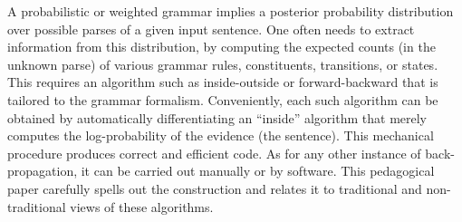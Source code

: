 A probabilistic or weighted grammar implies a posterior probability distribution over possible parses of a given input sentence.  One often needs to extract information from this distribution, by computing the expected counts (in the unknown parse) of various grammar rules, constituents, transitions, or states.  This requires an algorithm such as inside-outside or forward-backward that is tailored to the grammar formalism.  Conveniently, each such algorithm can be obtained by automatically differentiating an ``inside'' algorithm that merely computes the log-probability of the evidence (the sentence).  This mechanical procedure produces correct and efficient code.  As for any other instance of back-propagation, it can be carried out manually or by software. This pedagogical paper carefully spells out the construction and relates it to traditional and non-traditional views of these algorithms.
